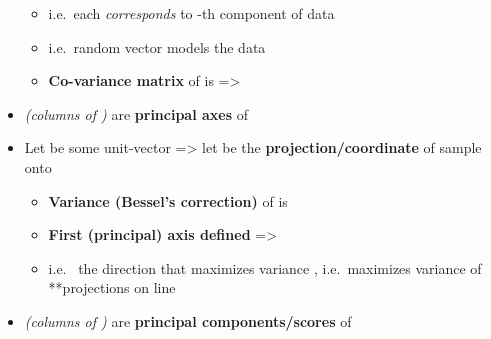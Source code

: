 \begin{itemize}
\begin{itemize}
          \item
                i.e.~each  \emph{corresponds} to -th component
                of data
          \item
                i.e.~random vector  models the
                data 
          \item
                \textbf{Co-variance matrix} of  is
                 =\textgreater{}
        \end{itemize}
  \item
         \emph{(columns of
          )} are \textbf{principal axes} of 
  \item
        Let  be some unit-vector
        =\textgreater{} let
         be the
        \textbf{projection/coordinate} of sample  onto

        \begin{itemize}

          \item
                \textbf{Variance (Bessel's correction)} of
                 is
          \item
                \textbf{First (principal) axis defined} =\textgreater{}
          \item
                i.e.~ the direction that maximizes
                variance , i.e.~maximizes
                variance of **projections on line
        \end{itemize}
  \item
        \emph{(columns of )} are \textbf{principal
          components/scores} of 


\end{itemize}

